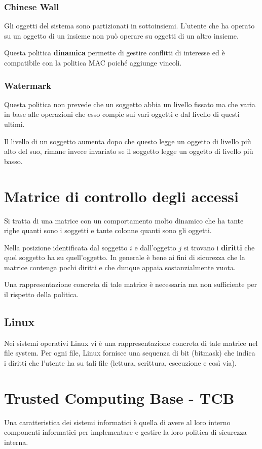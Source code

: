 \subsubsection{Chinese Wall}
Gli oggetti del sistema sono partizionati in sottoinsiemi. L'utente che ha operato su un oggetto di un insieme non
può operare su oggetti di un altro insieme.

Questa politica \textbf{dinamica} permette di gestire conflitti di interesse ed è compatibile con la politica MAC
poiché aggiunge vincoli.

\subsubsection{Watermark}
Questa politica non prevede che un soggetto abbia un livello fissato ma che varia in base alle operazioni che esso
compie sui vari oggetti e dal livello di questi ultimi.

Il livello di un soggetto aumenta dopo che questo legge un oggetto di livello più alto del suo, rimane invece invariato
se il soggetto legge un oggetto di livello più basso.

\section{Matrice di controllo degli accessi}
Si tratta di una matrice con un comportamento molto dinamico che ha tante righe quanti sono i soggetti e tante colonne
quanti sono gli oggetti.

Nella posizione identificata dal soggetto $i$ e dall'oggetto $j$ si trovano i \textbf{diritti} che quel soggetto ha
su quell'oggetto. In generale è bene ai fini di sicurezza che la matrice contenga pochi diritti e che dunque appaia
sostanzialmente vuota.

Una rappresentazione concreta di tale matrice è necessaria ma non sufficiente per il rispetto della politica.

\subsection{Linux}
Nei sistemi operativi Linux vi è una rappresentazione concreta di tale matrice nel file system. Per ogni file, Linux
fornisce una sequenza di bit (bitmask) che indica i diritti che l'utente ha su tali file (lettura, scrittura,
esecuzione e così via).

\section{Trusted Computing Base - TCB}
Una caratteristica dei sistemi informatici è quella di avere al loro interno componenti informatici per implementare
e gestire la loro politica di sicurezza interna.

